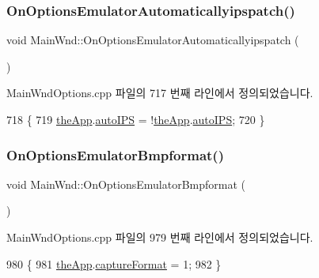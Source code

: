 \subsubsection{\texorpdfstring{On\+Options\+Emulator\+Automaticallyipspatch()}{OnOptionsEmulatorAutomaticallyipspatch()}}
{\footnotesize\ttfamily void Main\+Wnd\+::\+On\+Options\+Emulator\+Automaticallyipspatch (\begin{DoxyParamCaption}{ }\end{DoxyParamCaption})\hspace{0.3cm}{\ttfamily [protected]}}



Main\+Wnd\+Options.\+cpp 파일의 717 번째 라인에서 정의되었습니다.


\begin{DoxyCode}
718 \{
719   \mbox{\hyperlink{_v_b_a_8cpp_a8095a9d06b37a7efe3723f3218ad8fb3}{theApp}}.\mbox{\hyperlink{class_v_b_a_a7655aea2f21bde8159a666f977c30975}{autoIPS}} = !\mbox{\hyperlink{_v_b_a_8cpp_a8095a9d06b37a7efe3723f3218ad8fb3}{theApp}}.\mbox{\hyperlink{class_v_b_a_a7655aea2f21bde8159a666f977c30975}{autoIPS}};
720 \}
\end{DoxyCode}
\mbox{\label{class_main_wnd_abbfe0cda67be481a746de75493b6af07}} 
\subsubsection{\texorpdfstring{On\+Options\+Emulator\+Bmpformat()}{OnOptionsEmulatorBmpformat()}}
{\footnotesize\ttfamily void Main\+Wnd\+::\+On\+Options\+Emulator\+Bmpformat (\begin{DoxyParamCaption}{ }\end{DoxyParamCaption})\hspace{0.3cm}{\ttfamily [protected]}}



Main\+Wnd\+Options.\+cpp 파일의 979 번째 라인에서 정의되었습니다.


\begin{DoxyCode}
980 \{
981   \mbox{\hyperlink{_v_b_a_8cpp_a8095a9d06b37a7efe3723f3218ad8fb3}{theApp}}.\mbox{\hyperlink{class_v_b_a_a103f0b25433c57c4458a208a06799cf8}{captureFormat}} = 1;
982 \}
\end{DoxyCode}
\mbox{\label{class_main_wnd_a5d36b0308cca73a7aa4af8df269a743c}} 

